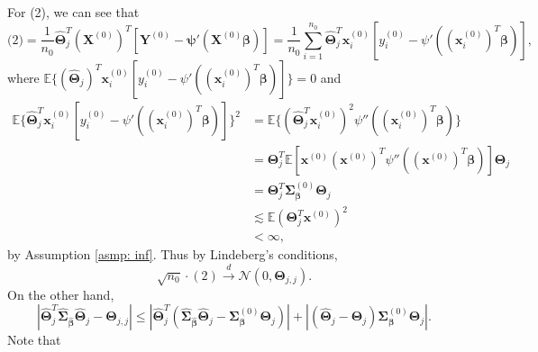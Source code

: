 \documentclass[12pt]{article}
\newcommand{\te}{\mathbb{E}}
\newcommand{\norma}[1]{\left|#1\right|}
\newcommand{\bbeta}{\bm{\beta}}
\newcommand{\hbeta}{\hat{\bm{\beta}}}
\newcommand{\bxk}[1]{\bm{x}^{(#1)}}
\newcommand{\bXk}[1]{\bm{X}^{(#1)}}
\newcommand{\bpsi}{\bm{\psi}}
\newcommand{\<}{\langle}
\renewcommand{\>}{\rangle}
\newcommand{\bTheta}{\bm{\Theta}}
\newcommand{\hTheta}{\widehat{\bm{\Theta}}}
\newcommand{\bSigma}{\bm{\Sigma}}
\newcommand{\hSigma}{\widehat{\bm{\Sigma}}}
\newcommand{\bSigmak}[1]{\bm{\Sigma}^{(#1)}}
\begin{document}
For (2), we can see that
\begin{equation}\label{eq: two terms decomp theta}
	\text{(2)} = \frac{1}{n_0}\hTheta_j^T(\bXk{0})^T[\bm{Y}^{(0)} - \bpsi'(\bXk{0}\bbeta)] = \frac{1}{n_0}\sum_{i=1}^{n_0}\hTheta_j^T\bxk{0}_i[y^{(0)}_i - \psi'((\bxk{0}_i)^T\bbeta)],
\end{equation}
where $\te\{(\hTheta_j)^T\bxk{0}_i[y^{(0)}_i - \psi'((\bxk{0}_i)^T\bbeta)]\} = 0$ and 
\begin{align}
	\te\{\hTheta_j^T\bxk{0}_i[y^{(0)}_i - \psi'((\bxk{0}_i)^T\bbeta)]\}^2 &= \te\{(\hTheta_j^T\bxk{0}_i)^2\psi''((\bxk{0}_i)^T\bbeta)\} \\
	&= \bTheta_j^T \te\left[\bxk{0}(\bxk{0})^T\psi''((\bxk{0})^T\bbeta)\right]\bTheta_j \\
	&= \bTheta_j^T \bSigma_{\bbeta}^{(0)}\bTheta_j \\
	&\lesssim  \te\left(\bTheta_j^T\bxk{0}\right)^2 \\
	&< \infty,
\end{align}
by Assumption \ref{asmp: inf}. Thus by Lindeberg's conditions,
\begin{equation}\label{eq: clt term 2}
	\sqrt{n_0}\cdot (\text{2}) \xrightarrow{d} \mathcal{N}(0, \bTheta_{j,j}).
\end{equation}
On the other hand,
\begin{equation}
	\norma{\hTheta_j^T\hSigma_{\hbeta}\hTheta_j - \bTheta_{j,j}} \leq \norma{\hTheta_j^T(\hSigma_{\hbeta}\hTheta_j - \bSigmak{0}_{\bbeta}\bTheta_{j})} + \norma{(\hTheta_j - \bTheta_j)\bSigmak{0}_{\bbeta}\bTheta_{j}}.
\end{equation}
Note that
\end{document}

